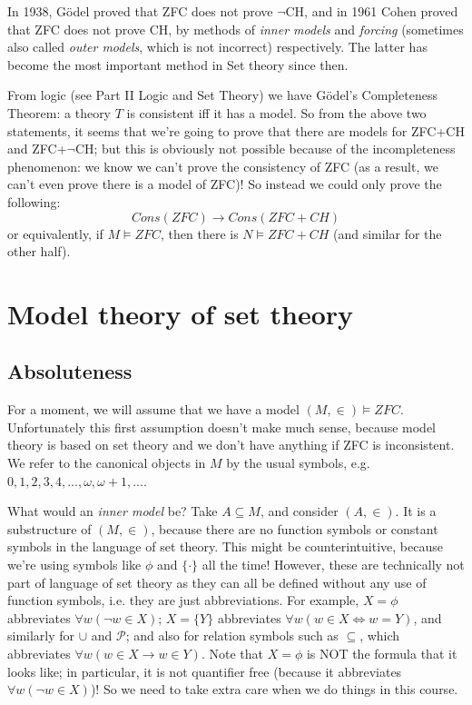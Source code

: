 \documentclass[a4paper]{article}
\begin{document}
In 1938, G\"{o}del proved that ZFC does not prove $\neg$CH, and in 1961 Cohen proved that ZFC does not prove CH, by methods of \emph{inner models} and \emph{forcing} (sometimes also called \emph{outer models}, which is not incorrect) respectively. The latter has become the most important method in Set theory since then.

From logic (see Part II Logic and Set Theory) we have G\"{o}del's Completeness Theorem: a theory $T$ is consistent iff it has a model. So from the above two statements, it seems that we're going to prove that there are models for ZFC+CH and ZFC+$\neg$CH; but this is obviously not possible because of the incompleteness phenomenon: we know we can't prove the consistency of ZFC (as a result, we can't even prove there is a model of ZFC)! So instead we could only prove the following:
$$Cons(ZFC) \to Cons(ZFC+CH)$$
or equivalently, if $M \vDash ZFC$, then there is $N \vDash ZFC+CH$ (and similar for the other half).

\newpage

\section{Model theory of set theory}

\subsection{Absoluteness}

For a moment, we will assume that we have a model $(M,\in) \vDash ZFC$. Unfortunately this first assumption doesn't make much sense, because model theory is based on set theory and we don't have anything if ZFC is inconsistent. We refer to the canonical objects in $M$ by the usual symbols, e.g. $0,1,2,3,4,...,\omega,\omega+1,...$.

What would an \emph{inner model} be? Take $A \subseteq M$, and consider $(A,\in)$. It is a substructure of $(M,\in)$, because there are no function symbols or constant symbols in the language of set theory. This might be counterintuitive, because we're using symbols like $\phi$ and $\{\cdot\}$ all the time! However, these are technically not part of language of set theory as they can all be defined without any use of function symbols, i.e. they are just abbreviations. For example, $X=\phi$ abbreviates $\forall w (\neg w \in X)$; $X=\{Y\}$ abbreviates $\forall w (w \in X \iff w = Y)$, and similarly for $\cup$ and $\mathcal{P}$; and also for relation symbols such as $\subseteq$, which abbreviates $\forall w (w \in X \to w \in Y)$. Note that $X=\phi$ is NOT the formula that it looks like; in particular, it is not quantifier free (because it abbreviates $\forall w (\neg w \in X)$)! So we need to take extra care when we do things in this course.
\end{document}
